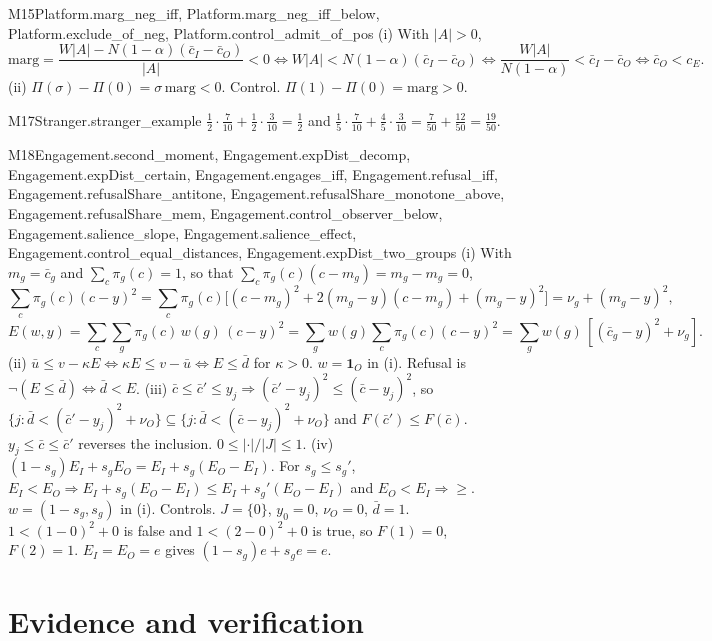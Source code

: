 \begin{mproof}{M15}{Platform.marg_neg_iff, Platform.marg_neg_iff_below, Platform.exclude_of_neg, Platform.control_admit_of_pos}
(i) With $|A|>0$,
\[
\mathrm{marg}=\frac{W|A|-N(1-\alpha)(\bar c_I-\bar c_O)}{|A|}<0
\iff W|A|<N(1-\alpha)(\bar c_I-\bar c_O)
\iff\frac{W|A|}{N(1-\alpha)}<\bar c_I-\bar c_O
\iff\bar c_O<c_E .
\]
(ii) $\Pi(\sigma)-\Pi(0)=\sigma\,\mathrm{marg}<0$.
Control. $\Pi(1)-\Pi(0)=\mathrm{marg}>0$.
\end{mproof}


\begin{mproof}{M17}{Stranger.stranger_example}
$\tfrac12\cdot\tfrac7{10}+\tfrac12\cdot\tfrac3{10}=\tfrac12$ and
$\tfrac15\cdot\tfrac7{10}+\tfrac45\cdot\tfrac3{10}=\tfrac{7}{50}+\tfrac{12}{50}=\tfrac{19}{50}$.
\end{mproof}

\begin{mproof}{M18}{Engagement.second_moment, Engagement.expDist_decomp, Engagement.expDist_certain, Engagement.engages_iff, Engagement.refusal_iff, Engagement.refusalShare_antitone, Engagement.refusalShare_monotone_above, Engagement.refusalShare_mem, Engagement.control_observer_below, Engagement.salience_slope, Engagement.salience_effect, Engagement.control_equal_distances, Engagement.expDist_two_groups}
(i) With $m_g=\bar c_g$ and $\sum_c\pi_g(c)=1$, so that
$\sum_c\pi_g(c)(c-m_g)=m_g-m_g=0$,
\[
\sum_c\pi_g(c)(c-y)^2
=\sum_c\pi_g(c)\big[(c-m_g)^2+2(m_g-y)(c-m_g)+(m_g-y)^2\big]
=\nu_g+(m_g-y)^2 ,
\]
\[
E(w,y)=\sum_c\sum_g\pi_g(c)\,w(g)\,(c-y)^2
=\sum_g w(g)\sum_c\pi_g(c)(c-y)^2
=\sum_g w(g)\,[(\bar c_g-y)^2+\nu_g].
\]
(ii) $\bar u\le v-\kappa E\iff\kappa E\le v-\bar u\iff E\le\bar d$ for
$\kappa>0$. $w=\mathbf 1_O$ in (i). Refusal is $\neg(E\le\bar d)\iff\bar d<E$.
(iii) $\bar c\le\bar c'\le y_j\Rightarrow(\bar c'-y_j)^2\le(\bar c-y_j)^2$, so
$\{j:\bar d<(\bar c'-y_j)^2+\nu_O\}\subseteq\{j:\bar d<(\bar c-y_j)^2+\nu_O\}$
and $F(\bar c')\le F(\bar c)$. $y_j\le\bar c\le\bar c'$ reverses the
inclusion. $0\le|\cdot|/|J|\le1$.
(iv) $(1-s_g)E_I+s_gE_O=E_I+s_g(E_O-E_I)$. For $s_g\le s_g'$,
$E_I<E_O\Rightarrow E_I+s_g(E_O-E_I)\le E_I+s_g'(E_O-E_I)$ and
$E_O<E_I\Rightarrow\ge$. $w=(1-s_g,s_g)$ in (i).
Controls. $J=\{0\}$, $y_0=0$, $\nu_O=0$, $\bar d=1$. $1<(1-0)^2+0$ is false
and $1<(2-0)^2+0$ is true, so $F(1)=0$, $F(2)=1$. $E_I=E_O=e$ gives
$(1-s_g)e+s_ge=e$.
\end{mproof}

\section{Evidence and verification}
\label{app:evidence}

